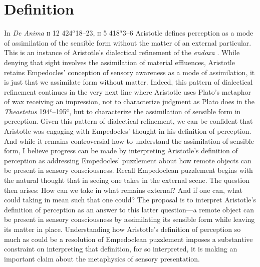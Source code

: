 \section{Definition} %
\label{sec:definition}

In \emph{De Anima} \textsc{ii} 12 424\( ^{a} \)18--23, \textsc{ii} 5 418\( ^{a} \)3--6 Aristotle defines perception as a mode of assimilation of the sensible form without the matter of an external particular. This is an instance of Aristotle's dialectical refinement of the \emph{endoxa} \citep[on Aristotle's dialectic in \emph{De Anima} see][]{Witt:1995kx}. While denying that sight involves the assimilation of material effluences, Aristotle retains Empedocles' conception of sensory awareness as a mode of assimilation, it is just that we assimilate form without matter. Indeed, this pattern of dialectical refinement continues in the very next line where Aristotle uses Plato's metaphor of wax receiving an impression, not to characterize judgment as Plato does in the \emph{Theaetetus} 194\( ^{c} \)--195\( ^{a} \), but to characterize the assimilation of sensible form in perception. Given this pattern of dialectical refinement, we can be confident that Aristotle was engaging with Empedocles' thought in his definition of perception. And while it remains controversial how to understand the assimilation of sensible form, I believe progress can be made by interpreting Aristotle's definition of perception as addressing Empedocles' puzzlement about how remote objects can be present in sensory consciousness. Recall Empedoclean puzzlement begins with the natural thought that in seeing one takes in the external scene. The question then arises: How can we take in what remains external? And if one can, what could taking in mean such that one could? The proposal is to interpret Aristotle's definition of perception as an answer to this latter question---a remote object can be present in sensory consciousness by assimilating its sensible form while leaving its matter in place. Understanding how Aristotle's definition of perception so much as could be a resolution of Empedoclean puzzlement imposes a substantive constraint on interpreting that definition, for so interpreted, it is making an important claim about the metaphysics of sensory presentation.

